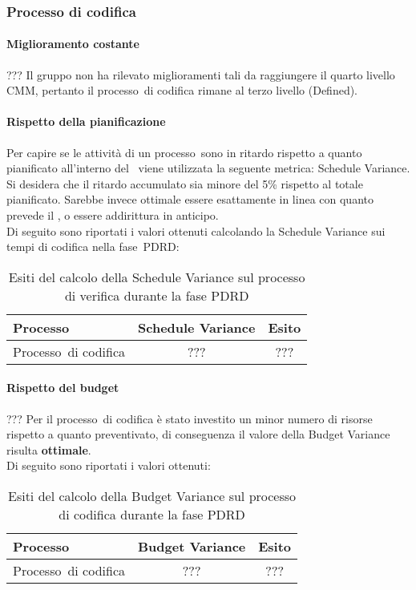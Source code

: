 \documentclass[../PianoDiQualifica.tex]{subfiles}
\begin{document}
\begin{appendices}
		\subsubsection{Processo di codifica}
			\paragraph{Miglioramento costante}
			??? Il gruppo non ha rilevato miglioramenti tali da raggiungere il quarto livello CMM\g, pertanto il processo\g\ di codifica rimane al terzo livello (Defined).
			
			\paragraph{Rispetto della pianificazione}
			Per capire se le attività di un processo\g\ sono in ritardo rispetto a quanto pianificato all'interno del \pianodiprogetto\ viene utilizzata la seguente metrica: Schedule Variance.\\
			Si desidera che il ritardo accumulato sia minore del 5\% rispetto al totale pianificato. Sarebbe invece ottimale essere esattamente in linea con quanto prevede il \pianodiprogetto, o essere addirittura in anticipo.\\
			Di seguito sono riportati i valori ottenuti calcolando la Schedule Variance sui tempi di codifica nella fase\g\ PDRD:
			
			\begin{table}[H]
				\centering
				\begin{tabular}{l * {2}{c}}
					\toprule
					\textbf{Processo} & \textbf{Schedule Variance} & \textbf{Esito} \\
					\midrule
					Processo\g\ di codifica & ??? &  ??? \\
					\bottomrule
				\end{tabular}
				\caption{Esiti del calcolo della Schedule Variance sul processo di verifica durante la fase PDRD}
				\label{tab:esiti_schedule_variance}
			\end{table}
			
			\paragraph{Rispetto del budget}
			??? Per il processo\g\ di codifica è stato investito un minor numero di risorse rispetto a quanto preventivato, di conseguenza il valore della Budget Variance risulta \textbf{ottimale}.\\
			Di seguito sono riportati i valori ottenuti:
			\begin{table}[H]
				\centering
				\begin{tabular}{l * {2}{c}}
					\toprule
					\textbf{Processo} & \textbf{Budget Variance} & \textbf{Esito} \\
					\midrule
					Processo\g\ di codifica & ??? &  ??? \\
					\bottomrule
				\end{tabular}
				\caption{Esiti del calcolo della Budget Variance sul processo di codifica durante la fase PDRD}
				\label{tab:esiti_budget_variance}
			\end{table}
			

\end{appendices}
\end{document}
